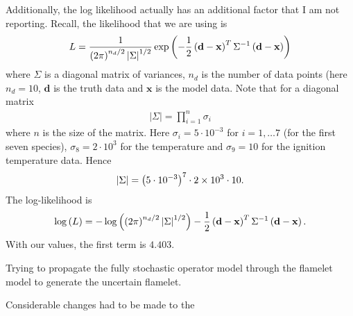 Additionally, the log likelihood actually has an additional factor that 
I am not reporting.  Recall, the likelihood that we are using is 
\begin{align}
  L = \frac{1}{\left(2\pi\right)^{n_{d}/2}\left|\Sigma\right|^{1/2}}
     \exp\left(-\frac{1}{2}\left(\mathbf{d} - \mathbf{x}\right)^{T}\Sigma^{-1}\left(\mathbf{d} - \mathbf{x}\right)\right)
\end{align}
where $\Sigma$ is a diagonal matrix of variances, $n_{d}$ is the number of data points (here
$n_{d} = 10$, $\mathbf{d}$ is the truth data and $\mathbf{x}$ is the model data.  Note that for a 
diagonal matrix 
\begin{align}
  \left|\Sigma\right| = \prod_{i=1}^{n}\sigma_{i}
\end{align}
where $n$ is the size of the matrix.  Here $\sigma_{i} = 5\cdot 10^{-3}$ for $i=1,\ldots 7$
(for the first seven species), $\sigma_{8} = 2\cdot 10^{3}$ for the temperature 
and $\sigma_{9} = 10$ for the ignition temperature data.  Hence
\begin{align}
  \left|\Sigma\right| = \left(5\cdot 10^{-3}\right)^{7} \cdot 2\times 10^{3} \cdot 10.
\end{align}
The log-likelihood is 
\begin{align}
  \log\left(L\right) = -\log\left(\left(2\pi\right)^{n_{d}/2}\left|\Sigma\right|^{1/2}\right) - 
      \frac{1}{2}\left(\mathbf{d} - \mathbf{x}\right)^{T}\Sigma^{-1}\left(\mathbf{d} - \mathbf{x}\right).
\end{align}
With our values, the first term is $4.403$.

Trying to propagate the fully stochastic operator model through the flamelet model to generate 
the uncertain flamelet.

Considerable changes had to be made to the 

